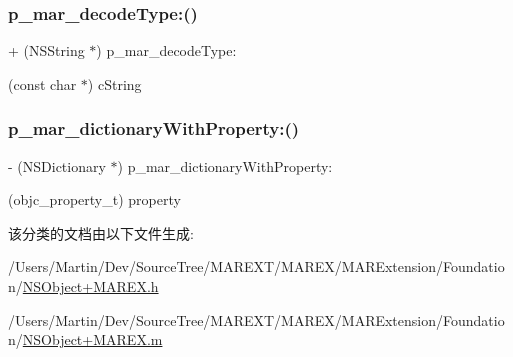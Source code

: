 \subsubsection{\texorpdfstring{p\+\_\+mar\+\_\+decode\+Type\+:()}{p\_mar\_decodeType:()}}
{\footnotesize\ttfamily + (N\+S\+String $\ast$) p\+\_\+mar\+\_\+decode\+Type\+: \begin{DoxyParamCaption}\item[{(const char $\ast$)}]{c\+String }\end{DoxyParamCaption}\hspace{0.3cm}{\ttfamily [implementation]}}

\mbox{\label{category_n_s_object_07_m_a_r_e_x___r_u_n_t_i_m_e_08_a884ea3cedee764151014588e09517e04}} 
\subsubsection{\texorpdfstring{p\+\_\+mar\+\_\+dictionary\+With\+Property\+:()}{p\_mar\_dictionaryWithProperty:()}}
{\footnotesize\ttfamily -\/ (N\+S\+Dictionary $\ast$) p\+\_\+mar\+\_\+dictionary\+With\+Property\+: \begin{DoxyParamCaption}\item[{(objc\+\_\+property\+\_\+t)}]{property }\end{DoxyParamCaption}\hspace{0.3cm}{\ttfamily [implementation]}}



该分类的文档由以下文件生成\+:\begin{DoxyCompactItemize}
\item 
/\+Users/\+Martin/\+Dev/\+Source\+Tree/\+M\+A\+R\+E\+X\+T/\+M\+A\+R\+E\+X/\+M\+A\+R\+Extension/\+Foundation/\hyperlink{_n_s_object_09_m_a_r_e_x_8h}{N\+S\+Object+\+M\+A\+R\+E\+X.\+h}\item 
/\+Users/\+Martin/\+Dev/\+Source\+Tree/\+M\+A\+R\+E\+X\+T/\+M\+A\+R\+E\+X/\+M\+A\+R\+Extension/\+Foundation/\hyperlink{_n_s_object_09_m_a_r_e_x_8m}{N\+S\+Object+\+M\+A\+R\+E\+X.\+m}\end{DoxyCompactItemize}
